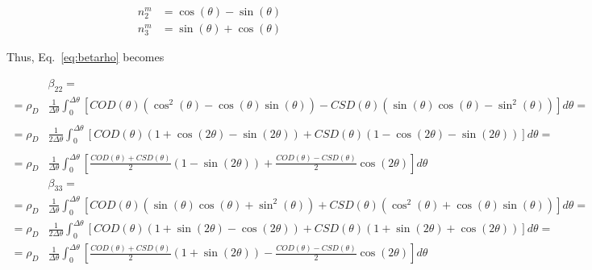 \documentclass[review]{elsarticle}
\begin{document}
\begin{equation}
\begin{aligned}
n_{2}^{m}&=\cos{\left(\theta\right)}-\sin{\left(\theta\right)}\\
n_{3}^{m}&=\sin{\left(\theta\right)}+\cos{\left(\theta\right)}
\end{aligned}
\end{equation}

Thus, Eq.~\ref{eq:betarho} becomes

\begin{equation}
\begin{aligned}
&\beta_{22}=\\=\rho_{D}&\frac{1}{\Delta\theta}\int_{0}^{\Delta\theta}\left[COD\left(\theta\right)\left(\cos^{2}{\left(\theta\right)}-\cos{\left(\theta\right)}\sin{\left(\theta\right)}\right)-CSD\left(\theta\right)\left(\sin{\left(\theta\right)}\cos{\left(\theta\right)}-\sin^{2}{\left(\theta\right)}\right)\right]d\theta=\\
\\=\rho_{D}&\frac{1}{2\Delta\theta}\int_{0}^{\Delta\theta}\left[COD\left(\theta\right)\left(1+\cos\left(2\theta\right)-\sin\left(2\theta\right)\right)+CSD\left(\theta\right)\left(1-\cos\left(2\theta\right)-\sin\left(2\theta\right)\right)\right]d\theta=\\
\\=\rho_{D}&\frac{1}{\Delta\theta}\int_{0}^{\Delta\theta}\left[\frac{COD\left(\theta\right)+CSD\left(\theta\right)}{2}\left(1-\sin\left(2\theta\right)\right)+\frac{COD\left(\theta\right)-CSD\left(\theta\right)}{2}\cos\left(2\theta\right)\right]d\theta\\
&\beta_{33}=\\
=\rho_{D}&\frac{1}{\Delta\theta}\int_{0}^{\Delta\theta}\left[COD\left(\theta\right)\left(\sin{\left(\theta\right)}\cos{\left(\theta\right)}+\sin^{2}{\left(\theta\right)}\right)+CSD\left(\theta\right)\left(\cos^{2}{\left(\theta\right)}+\cos{\left(\theta\right)}\sin{\left(\theta\right)}\right)\right]d\theta=\\
=\rho_{D}&\frac{1}{2\Delta\theta}\int_{0}^{\Delta\theta}\left[COD\left(\theta\right)\left(1+\sin\left(2\theta\right)-\cos\left(2\theta\right)\right)+CSD\left(\theta\right)\left(1+\sin\left(2\theta\right)+\cos\left(2\theta\right)\right)\right]d\theta=\\
=\rho_{D}&\frac{1}{\Delta\theta}\int_{0}^{\Delta\theta}\left[\frac{COD\left(\theta\right)+CSD\left(\theta\right)}{2}\left(1+\sin\left(2\theta\right)\right)-\frac{COD\left(\theta\right)-CSD\left(\theta\right)}{2}\cos\left(2\theta\right)\right]d\theta\\

\end{aligned}
\end{equation}
\end{document}
